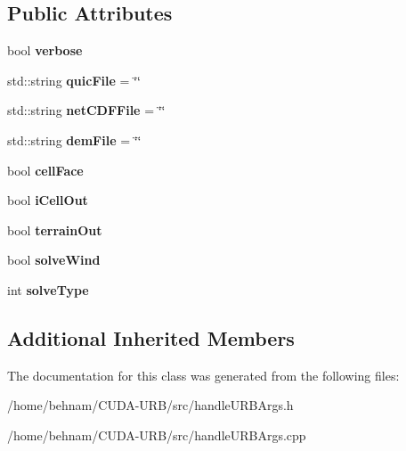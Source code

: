 \subsection*{Public Attributes}
\begin{DoxyCompactItemize}
\item 
\mbox{\label{classURBArgs_a7cec6e6267db1c1b5e923e0840f8bf9a}} 
bool {\bfseries verbose}
\item 
\mbox{\label{classURBArgs_a2177c089cfb7963f56b14a763f288160}} 
std\+::string {\bfseries quic\+File} = \char`\"{}\char`\"{}
\item 
\mbox{\label{classURBArgs_a7e9de53f20f697bf70524f6a7919ab77}} 
std\+::string {\bfseries net\+C\+D\+F\+File} = \char`\"{}\char`\"{}
\item 
\mbox{\label{classURBArgs_ab0f1e79a05e844622fd958420f4ed695}} 
std\+::string {\bfseries dem\+File} = \char`\"{}\char`\"{}
\item 
\mbox{\label{classURBArgs_aa0fa7ab88f36fabed3d10b00a0cd66c9}} 
bool {\bfseries cell\+Face}
\item 
\mbox{\label{classURBArgs_a99598c002614de789d1e4ba21c5503ce}} 
bool {\bfseries i\+Cell\+Out}
\item 
\mbox{\label{classURBArgs_a51621034c772ef079865052bc7f8031f}} 
bool {\bfseries terrain\+Out}
\item 
\mbox{\label{classURBArgs_afeabfb9e13f5eb219cf2ef4d0e1b091a}} 
bool {\bfseries solve\+Wind}
\item 
\mbox{\label{classURBArgs_a2e78abe9008d2d774b577b95c7b99354}} 
int {\bfseries solve\+Type}
\end{DoxyCompactItemize}
\subsection*{Additional Inherited Members}


The documentation for this class was generated from the following files\+:\begin{DoxyCompactItemize}
\item 
/home/behnam/\+C\+U\+D\+A-\/\+U\+R\+B/src/handle\+U\+R\+B\+Args.\+h\item 
/home/behnam/\+C\+U\+D\+A-\/\+U\+R\+B/src/handle\+U\+R\+B\+Args.\+cpp\end{DoxyCompactItemize}
